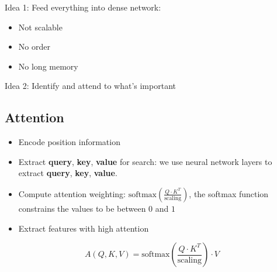 \documentclass[12pt, a4paper, oneside]{article}
\begin{document}
Idea 1: Feed everything into dense network:
\begin{itemize}
    \item Not scalable
    \item No order
    \item No long memory
\end{itemize}

Idea 2: Identify and attend to what's important

\subsection{Attention}

\begin{itemize}
    \item Encode position information
    \item Extract \textbf{query}, \textbf{key}, \textbf{value} for search: we use neural network layers to extract \textbf{query}, \textbf{key}, \textbf{value}.
    \item Compute attention weighting: $\text{softmax}(\frac{Q\cdot K^{T}}{\text{scaling}})$, the softmax function constrains the values to be between $0$ and $1$
    \item Extract features with high attention
\end{itemize}

\begin{equation*}
    A(Q,K,V)=\text{softmax}(\frac{Q\cdot K^{T}}{\text{scaling}})\cdot V
\end{equation*}
\end{document}

